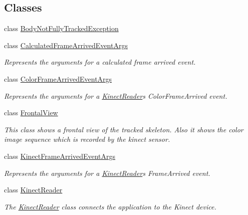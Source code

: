 \subsection*{Classes}
\begin{DoxyCompactItemize}
\item 
class \hyperlink{class_rowing_monitor_1_1_model_1_1_body_not_fully_tracked_exception}{Body\+Not\+Fully\+Tracked\+Exception}
\item 
class \hyperlink{class_rowing_monitor_1_1_model_1_1_calculated_frame_arrived_event_args}{Calculated\+Frame\+Arrived\+Event\+Args}
\begin{DoxyCompactList}\small\item\em Represents the arguments for a calculated frame arrived event. \end{DoxyCompactList}\item 
class \hyperlink{class_rowing_monitor_1_1_model_1_1_color_frame_arrived_event_args}{Color\+Frame\+Arrived\+Event\+Args}
\begin{DoxyCompactList}\small\item\em Represents the arguments for a \hyperlink{class_rowing_monitor_1_1_model_1_1_kinect_reader}{Kinect\+Reader}\textquotesingle{}s Color\+Frame\+Arrived event. \end{DoxyCompactList}\item 
class \hyperlink{class_rowing_monitor_1_1_model_1_1_frontal_view}{Frontal\+View}
\begin{DoxyCompactList}\small\item\em This class shows a frontal view of the tracked skeleton. Also it shows the color image sequence which is recorded by the kinect sensor. \end{DoxyCompactList}\item 
class \hyperlink{class_rowing_monitor_1_1_model_1_1_kinect_frame_arrived_event_args}{Kinect\+Frame\+Arrived\+Event\+Args}
\begin{DoxyCompactList}\small\item\em Represents the arguments for a \hyperlink{class_rowing_monitor_1_1_model_1_1_kinect_reader}{Kinect\+Reader}\textquotesingle{}s Frame\+Arrived event. \end{DoxyCompactList}\item 
class \hyperlink{class_rowing_monitor_1_1_model_1_1_kinect_reader}{Kinect\+Reader}
\begin{DoxyCompactList}\small\item\em The \hyperlink{class_rowing_monitor_1_1_model_1_1_kinect_reader}{Kinect\+Reader} class connects the application to the Kinect device. \end{DoxyCompactList}\item 

\end{DoxyCompactItemize}
